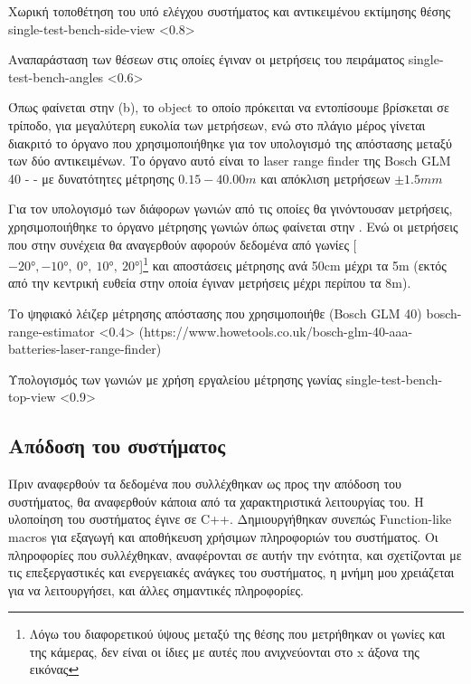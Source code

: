 {Χωρική τοποθέτηση του υπό ελέγχου συστήματος και αντικειμένου εκτίμησης θέσης}%
{single-test-bench-side-view}%
<0.8>

{Αναπαράσταση των θέσεων στις οποίες έγιναν οι μετρήσεις του πειράματος}%
{single-test-bench-angles}%
<0.6>

Όπως φαίνεται στην  (b), το object το οποίο πρόκειται να εντοπίσουμε βρίσκεται σε τρίποδο, για μεγαλύτερη ευκολία των μετρήσεων, ενώ στο πλάγιο μέρος γίνεται διακριτό το όργανο που χρησιμοποιήθηκε για τον υπολογισμό της απόστασης μεταξύ των δύο αντικειμένων. Το όργανο αυτό είναι το laser range finder της Bosch GLM 40 -  - με δυνατότητες μέτρησης $0.15-40.00 m$ και απόκλιση μετρήσεων $\pm1.5mm$

Για τον υπολογισμό των διάφορων γωνιών από τις οποίες θα γινόντουσαν μετρήσεις, χρησιμοποιήθηκε το όργανο μέτρησης γωνιών όπως φαίνεται στην . Ενώ οι μετρήσεις που στην συνέχεια θα αναγερθούν αφορούν δεδομένα από γωνίες [$-20\si{\degree},-10\si{\degree},~0\si{\degree},~10\si{\degree},~20\si{\degree}$]\footnote{Λόγω του διαφορετικού ύψους μεταξύ της θέσης που μετρήθηκαν οι γωνίες και της κάμερας, δεν είναι οι ίδιες με αυτές που ανιχνεύονται στο x άξονα της εικόνας} και αποστάσεις μέτρησης ανά 50cm μέχρι τα 5m (εκτός από την κεντρική ευθεία στην οποία έγιναν μετρήσεις μέχρι περίπου τα 8m).

{Το ψηφιακό λέιζερ μέτρησης απόστασης που χρησιμοποιήθε (Bosch GLM 40)}%
{bosch-range-estimator}%
<0.4>%
(https://www.howetools.co.uk/bosch-glm-40-aaa-batteries-laser-range-finder)

{Υπολογισμός των γωνιών με χρήση εργαλείου μέτρησης γωνίας}%
{single-test-bench-top-view}%
<0.9>

\subsection{Απόδοση του συστήματος} \label{sec:single-expe-system}

Πριν αναφερθούν τα δεδομένα που συλλέχθηκαν ως προς την απόδοση του συστήματος, θα αναφερθούν κάποια από τα 
χαρακτηριστικά λειτουργίας του. Η υλοποίηση του συστήματος έγινε σε C++. Δημιουργήθηκαν συνεπώς Function-like macros για εξαγωγή και αποθήκευση χρήσιμων πληροφοριών του συστήματος. Οι πληροφορίες που συλλέχθηκαν, αναφέρονται σε αυτήν την ενότητα, και σχετίζονται με τις επεξεργαστικές και ενεργειακές ανάγκες του συστήματος, η μνήμη μου χρειάζεται για να λειτουργήσει, και άλλες σημαντικές πληροφορίες.

